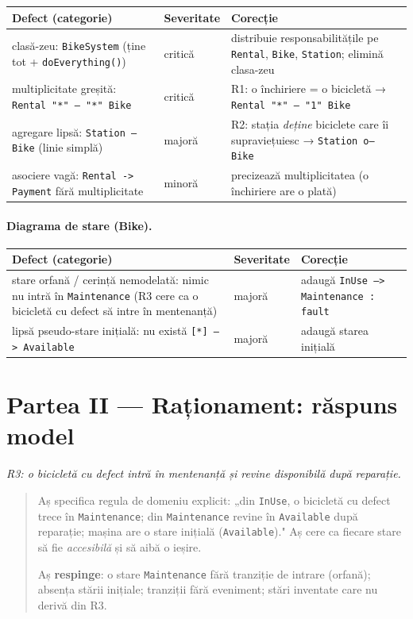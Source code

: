 \documentclass[12pt,a4paper]{article}
\begin{document}
\begin{longtable}{p{4.2cm} p{1.8cm} p{6cm}}
\textbf{Defect (categorie)} & \textbf{Severitate} & \textbf{Corecție} \\
\hline
\endhead
clasă-zeu: \texttt{BikeSystem} (ține tot + \texttt{doEverything()}) &
critică & distribuie responsabilitățile pe \texttt{Rental},
\texttt{Bike}, \texttt{Station}; elimină clasa-zeu \\
multiplicitate greșită: \texttt{Rental "*" -- "*" Bike} & critică &
R1: o închiriere = o bicicletă → \texttt{Rental "*" -- "1" Bike} \\
agregare lipsă: \texttt{Station -- Bike} (linie simplă) & majoră &
R2: stația \emph{deține} biciclete care îi supraviețuiesc →
\texttt{Station o-- Bike} \\
asociere vagă: \texttt{Rental -> Payment} fără multiplicitate & minoră &
precizează multiplicitatea (o închiriere are o plată) \\
\end{longtable}

\paragraph{Diagrama de stare (Bike).}

\begin{longtable}{p{4.2cm} p{1.8cm} p{6cm}}
\textbf{Defect (categorie)} & \textbf{Severitate} & \textbf{Corecție} \\
\hline
\endhead
stare orfană / cerință nemodelată: nimic nu intră în
\texttt{Maintenance} (R3 cere ca o bicicletă cu defect să intre în
mentenanță) & majoră & adaugă \texttt{InUse --> Maintenance : fault} \\
lipsă pseudo-stare inițială: nu există \texttt{[*] --> Available} &
majoră & adaugă starea inițială \\
\end{longtable}

\section*{Partea II — Raționament: răspuns model}

\textit{R3: o bicicletă cu defect intră în mentenanță și revine
disponibilă după reparație.}

\begin{quote}
Aș specifica regula de domeniu explicit: „din \texttt{InUse}, o
bicicletă cu defect trece în \texttt{Maintenance}; din
\texttt{Maintenance} revine în \texttt{Available} după reparație;
mașina are o stare inițială (\texttt{Available})." Aș cere ca fiecare
stare să fie \emph{accesibilă} și să aibă o ieșire.

Aș \textbf{respinge}: o stare \texttt{Maintenance} fără tranziție de
intrare (orfană); absența stării inițiale; tranziții fără eveniment;
stări inventate care nu derivă din R3.
\end{quote}
\end{document}
